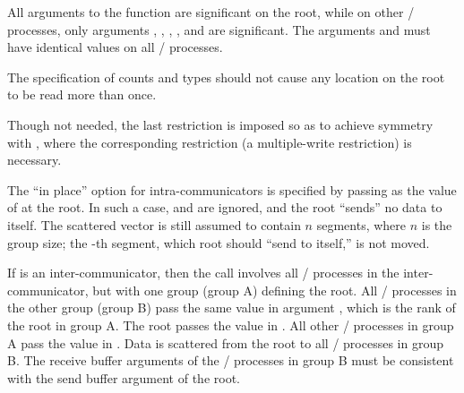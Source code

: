 All arguments to the function are significant on the root,
while on other \MPI/ processes, only arguments , ,
, ,
and
 are significant.
The arguments  and 
must have identical values on all \MPI/ processes.

The specification of counts and types
should not cause any location on the root to be read more than
once.

\begin{rationale}
Though not needed, the last restriction is imposed so as
to achieve symmetry with
, where the corresponding restriction (a multiple-write
restriction) is necessary.
\end{rationale}

The ``in place'' option  for intra-communicators is specified by passing
 as
the value of  at the root.  In such a
case,
 and  are ignored, and the root
``sends'' no data to itself. The scattered vector is still assumed to
contain $n$ segments, where $n$ is the group size; the -th
segment, which root should ``send to itself,'' is not moved.

If  is an inter-communicator, then the call involves all
\MPI/ processes in the inter-communicator, but with one group (group A) defining the
root.  All \MPI/ processes in the other group (group B) pass the same value
in argument
, which is the rank of the root in group A.  The root
passes the value  in .
All other \MPI/ processes in group A pass the value  in
.
Data is scattered from the root to all \MPI/ processes in
group B.  The receive buffer arguments of the \MPI/ processes in group B
must be consistent with the send buffer argument of the root.


